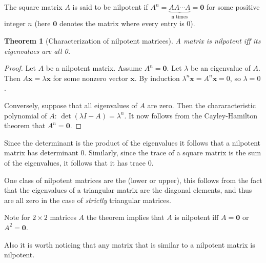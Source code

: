 \documentclass[12pt]{article}
\newtheorem*{thm}{Theorem}
\begin{document}
The square matrix $A$ is said to be nilpotent if $A^n = \underbrace{AA\cdots A}_{\textrm{n times}} = \mathbf{0}$ for some positive integer $n$ (here $\mathbf{0}$ 
denotes the matrix where every entry is 0).

\begin{thm}[Characterization of nilpotent matrices]
A matrix is nilpotent iff its eigenvalues are all 0.
\end{thm}

\begin{proof}
Let $A$ be a nilpotent matrix. Assume $A^n = \mathbf{0}$. Let $\lambda$ be an eigenvalue of $A$.
Then $A\mathbf{x} = \lambda \mathbf{x}$ for some nonzero vector $\mathbf{x}$.
By induction $\lambda^n \mathbf{x} = A^n \mathbf{x} = 0$, so $\lambda = 0$.

Conversely, suppose that all eigenvalues of $A$ are zero. Then the chararacteristic
polynomial of $A$: $\det(\lambda I - A) = \lambda^n$. It now follows from the
Cayley-Hamilton theorem that $A^n = \mathbf{0}$.
\end{proof}

Since the determinant is the product of the eigenvalues it follows that a nilpotent matrix has determinant 0. Similarly, since the trace of a square matrix is the sum of the eigenvalues, it follows that it has trace 0. 

One class of nilpotent matrices are the  (lower or upper), this follows from the fact that the eigenvalues of a triangular matrix are the diagonal elements, and thus are all zero in the case of \emph{strictly} triangular matrices.


Note for $2\times2$ matrices $A$ the theorem implies that $A$ is nilpotent iff $A=\mathbf{0}$ or $A^2=\mathbf{0}$.

Also it is worth noticing that any matrix that is similar to a nilpotent matrix is nilpotent.
\end{document}
